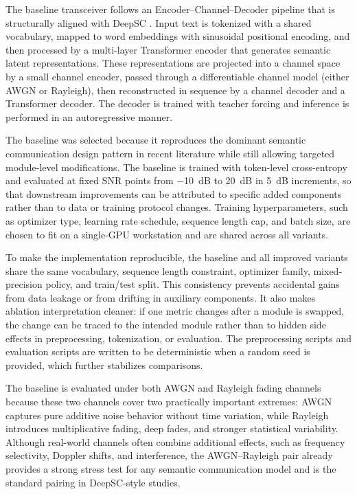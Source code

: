 The baseline transceiver follows an Encoder--Channel--Decoder pipeline that is structurally aligned with DeepSC \cite{xie2021deepsc}. Input text is tokenized with a shared vocabulary, mapped to word embeddings with sinusoidal positional encoding, and then processed by a multi-layer Transformer encoder that generates semantic latent representations. These representations are projected into a channel space by a small channel encoder, passed through a differentiable channel model (either AWGN or Rayleigh), then reconstructed in sequence by a channel decoder and a Transformer decoder. The decoder is trained with teacher forcing and inference is performed in an autoregressive manner.

The baseline was selected because it reproduces the dominant semantic communication design pattern in recent literature while still allowing targeted module-level modifications. The baseline is trained with token-level cross-entropy and evaluated at fixed SNR points from \SI{-10}{dB} to \SI{20}{dB} in \SI{5}{dB} increments, so that downstream improvements can be attributed to specific added components rather than to data or training protocol changes. Training hyperparameters, such as optimizer type, learning rate schedule, sequence length cap, and batch size, are chosen to fit on a single-GPU workstation and are shared across all variants.

To make the implementation reproducible, the baseline and all improved variants share the same vocabulary, sequence length constraint, optimizer family, mixed-precision policy, and train/test split. This consistency prevents accidental gains from data leakage or from drifting in auxiliary components. It also makes ablation interpretation cleaner: if one metric changes after a module is swapped, the change can be traced to the intended module rather than to hidden side effects in preprocessing, tokenization, or evaluation. The preprocessing scripts and evaluation scripts are written to be deterministic when a random seed is provided, which further stabilizes comparisons.

The baseline is evaluated under both AWGN and Rayleigh fading channels because these two channels cover two practically important extremes: AWGN captures pure additive noise behavior without time variation, while Rayleigh introduces multiplicative fading, deep fades, and stronger statistical variability. Although real-world channels often combine additional effects, such as frequency selectivity, Doppler shifts, and interference, the AWGN--Rayleigh pair already provides a strong stress test for any semantic communication model and is the standard pairing in DeepSC-style studies.

